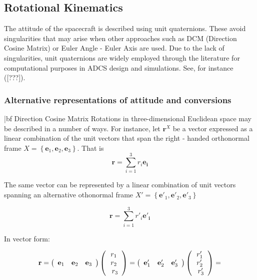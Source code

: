 \subsection{Rotational Kinematics}

The attitude of the spacecraft is described using unit quaternions. These avoid singularities that may arise when other approaches such as DCM (Direction Cosine Matrix) or Euler Angle - Euler Axis are used. Due to the lack of singularities, unit quaternions are widely employed through the literature for computational purposes in ADCS design and simulations. See, for instance ([???]).\\

\subsubsection{Alternative representations of attitude and conversions}

{|bf Direction Cosine Matrix}
Rotations in three-dimensional Euclidean space may be described in a number of ways. For instance, let $\mathbf{r}^X$ be a vector expressed as a linear combination of the unit vectors that span the right - handed orthonormal frame $X = \left\{\mathbf{e}_1, \mathbf{e}_2, \mathbf{e}_3 \right\}$. That is
\begin{equation}
\mathbf{r} = \sum_{i=1}^{3}r_i \mathbf{e_i}
\end{equation}

The same vector can be represented by a linear combination of unit vectors spanning an alternative othonormal frame {$X' = \left\{\mathbf{e}'_1, \mathbf{e}'_2, \mathbf{e}'_3 \right\}$}

\begin{equation}
\mathbf{r} = \sum_{i=1}^{3}r'_i \mathbf{e'_i}
\end{equation}

In vector form:

\begin{equation}
	\mathbf{r} = \left(\begin{array} {c c c}\mathbf{e}_1 & \mathbf{e}_2 & \mathbf{e}_3 \end{array} \right) \left( \begin{array}{c} r_1\\ r_2\\\ r_3 \end{array}\right) =
	\left( \begin{array} {c c c}\mathbf{e}'_1 & \mathbf{e}'_2 & \mathbf{e}'_3 \end{array} \right) \left( \begin{array}{c} r'_1\\ r'_2\\\ r'_3 \end{array}\right) =
\end{equation}

